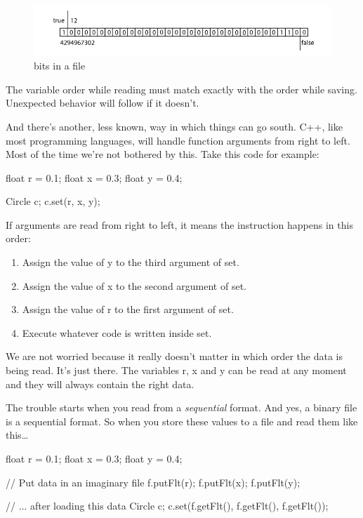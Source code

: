 \begin{figure}[ht]
\centering
\includegraphics[width=0.8\linewidth]{images/filebits.png}
\caption[]{bits in a file}
\label{fig:filebits}
\end{figure}

\begin{note}
The variable order while reading must match exactly with the order while saving. Unexpected behavior will follow if it doesn't.
\end{note}

And there's another, less known, way in which things can go south. C++, like most programming languages, will handle function arguments from right to left. Most of the time we're not bothered by this. Take this code for example:
\begin{code}
float r = 0.1;
float x = 0.3;
float y = 0.4;

Circle c;
c.set(r, x, y);
\end{code}

If arguments are read from right to left, it means the instruction  happens in this order:

\begin{enumerate}
	\item Assign the value of y to the third argument of set.
	\item Assign the value of x to the second argument of set.
	\item Assign the value of r to the first argument of set.
	\item Execute whatever code is written inside set.
\end{enumerate}

We are not worried because it really doesn't matter in which order the data is being read. It's just there. The variables r, x and y can be read at any moment and they will always contain the right data.

The trouble starts when you read from a \textit{sequential} format. And yes, a binary file is a sequential format. So when you store these values to a file and read them like this\ldots

\begin{code}
float r = 0.1;
float x = 0.3;
float y = 0.4;

// Put data in an imaginary file
f.putFlt(r);
f.putFlt(x);
f.putFlt(y);

// ... after loading this data
Circle c;
c.set(f.getFlt(), f.getFlt(), f.getFlt());
\end{code}

